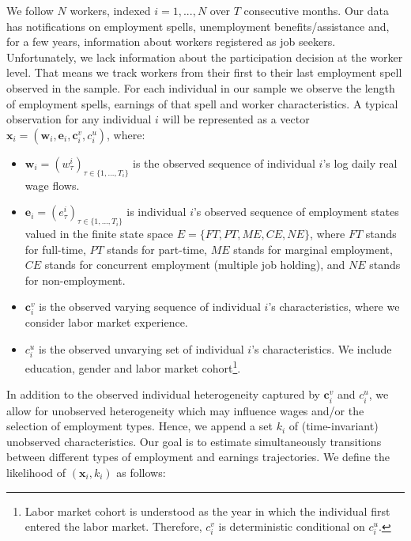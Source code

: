 \documentclass[12pt, a4paper]{article}
\begin{document}
We follow $N$ workers, indexed $i=1,...,N$ over $T$ consecutive months. Our data has notifications on employment spells, unemployment benefits/assistance and, for a few years, information about workers registered as job seekers. Unfortunately, we lack information about the participation decision at the worker level. That means we track workers from their first to their last employment spell observed in the sample. For each individual in our sample we observe the length of employment spells, earnings of that spell and worker characteristics. A typical observation for any individual $i$ will be represented as a vector $\textbf{x}_i=(\textbf{w}_i,\textbf{e}_i,\textbf{c}_i^v,c_i^u)$, where:
\vspace{0.2 cm}
\begin{itemize}
\setlength{\itemsep}{0.2 cm}
\item $\textbf{w}_i=(w_{\tau}^i)_{\tau\in\{1,...,T_{i}\}}$ is the observed sequence of individual $i$'s log daily real wage flows.
\item $\textbf{e}_i=(e_{\tau}^i)_{\tau\in\{1,...,T_{i}\}}$  is individual $i$'s observed sequence of employment states valued in the finite state space $E=\{FT,PT,ME,CE,NE\}$, where $FT$ stands for full-time, $PT$ stands for part-time, $ME$ stands for marginal employment, $CE$ stands for concurrent employment (multiple job holding), and $NE$ stands for non-employment. 
\item $\textbf{c}_i^v$ is the observed varying sequence of individual $i$'s characteristics, where we consider labor market experience.
\item $c_i^{u}$ is the observed unvarying set of individual $i$'s characteristics. We include education, gender and labor market cohort\footnote{Labor market cohort is understood as the year in which the individual first entered the labor market. Therefore, $c_i^v$ is deterministic conditional on $c_i^u$.}.
\end{itemize}
\vspace{0.2 cm}


In addition to the observed individual heterogeneity captured by $\textbf{c}_i^v$ and $c_i^{u}$, we allow for unobserved heterogeneity which may influence wages and/or the selection of employment types. Hence, we append a set $k_i$ of (time-invariant) unobserved characteristics. Our goal is to estimate simultaneously transitions between different types of employment and earnings trajectories. We define the likelihood of $(\textbf{x}_i,k_i)$ as follows:
\end{document}
